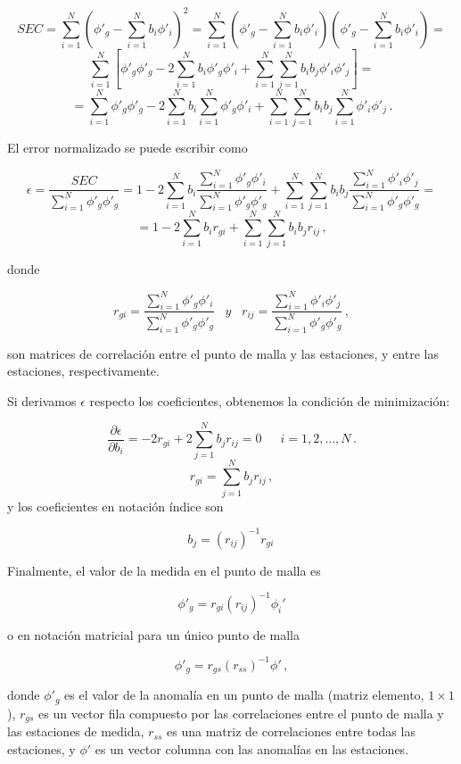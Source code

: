 \documentclass[
]{agujournal2019}
\begin{document}
\[SEC=\sum\limits^N_{i=1}\left(\phi'_g-\sum\limits_{i=1}^N b_i\phi'_i \right)^2
     =\sum\limits^N_{i=1}\left(\phi'_g-\sum\limits_{i=1}^N b_i\phi'_i \right)\left(\phi'_g-\sum\limits_{i=1}^N b_i\phi'_i \right)=\]
\[\sum\limits^N_{i=1}\left[\phi'_g \phi'_g -2\sum\limits_{i=1}^N b_i\phi'_g\phi'_i
      +\sum\limits^N_{i=1}\sum\limits^N_{j=1} b_i b_j \phi'_i \phi'_j \right]=\]
\[=\sum\limits^N_{i=1}\phi'_g \phi'_g -2 \sum\limits^N_{i=1} b_i \sum\limits^N_{i=1} \phi'_g\phi'_i + \sum\limits^N_{i=1}\sum\limits^N_{j=1}
b_i b_j \sum\limits^N_{i=1} \phi'_i \phi'_j\,.\]

El error normalizado se puede escribir como

\[\epsilon=\frac{SEC}{\sum\limits^N_{i=1}\phi'_g \phi'_g}=1-2 \sum\limits^N_{i=1} b_i \frac{\sum\limits^N_{i=1} \phi'_g\phi'_i}{\sum\limits^N_{i=1}\phi'_g \phi'_g} + \sum\limits^N_{i=1}\sum\limits^N_{j=1} b_i b_j \frac{\sum\limits^N_{i=1} \phi'_i \phi'_j}{\sum\limits^N_{i=1}\phi'_g \phi'_g}=\]
\[=1-2 \sum\limits^N_{i=1} b_i r_{gi} + \sum\limits^N_{i=1}\sum\limits^N_{j=1} b_i b_j r_{ij}\,,\]

donde

\[r_{gi}=\frac{\sum\limits^N_{i=1} \phi'_g\phi'_i}{\sum\limits^N_{i=1}\phi'_g \phi'_g}\,\,\,\,\,{ y}\,\,\,\,\,r_{ij}=\frac{\sum\limits^N_{i=1} \phi'_i \phi'_j}{\sum\limits^N_{i=1}\phi'_g \phi'_g}\,,\]

son matrices de correlación entre el punto de malla y las estaciones, y
entre las estaciones, respectivamente.

Si derivamos \(\epsilon\) respecto los coeficientes, obtenemos la
condición de minimización:

\[\frac{\partial{\epsilon}}{\partial{b_i}}=-2 r_{gi} + 2\sum\limits^N_{j=1}b_j r_{ij}=0\,\,\,\,\,\,\,\,\,i=1,2,...,N\,.\]
\[r_{gi}=\sum\limits^N_{j=1}b_j r_{ij}\,,\] y los coeficientes en
notación índice son

\[b_j=(r_{ij})^{-1}r_{gi}\,\]

Finalmente, el valor de la medida en el punto de malla es

\[\phi'_g=r_{gi}(r_{ij})^{-1}\phi_i'\]

o en notación matricial para un único punto de malla

\[\phi'_g=r_{gs}(r_{ss})^{-1}\phi'\,,\]

donde \(\phi'_g\) es el valor de la anomalía en un punto de malla
(matriz elemento, \(1\times 1\)), \(r_{gs}\) es un vector fila compuesto
por las correlaciones entre el punto de malla y las estaciones de
medida, \(r_{ss}\) es una matriz de correlaciones entre todas las
estaciones, y \(\phi'\) es un vector columna con las anomalías en las
estaciones.
\end{document}
